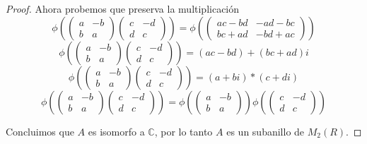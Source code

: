 \documentclass[letter,twoside,12pt]{article}
\begin{document}
\begin{proof}
Ahora probemos que preserva la multiplicaci\'on
\[ \phi\left(\left( \begin{array}{cc}
a & -b \\
b & a \end{array} \right)\left( \begin{array}{cc}
c & -d \\
d & c \end{array} \right)\right) = \phi\left(\left( \begin{array}{cc}
ac-bd & -ad-bc \\
bc+ad & -bd+ac \end{array} \right)\right)\]
\[ \phi\left(\left( \begin{array}{cc}
a & -b \\
b & a \end{array} \right)\left( \begin{array}{cc}
c & -d \\
d & c \end{array} \right)\right) = (ac-bd)+(bc+ad)i\]
\[ \phi\left(\left( \begin{array}{cc}
a & -b \\
b & a \end{array} \right)\left( \begin{array}{cc}
c & -d \\
d & c \end{array} \right)\right) = (a+bi)*(c+di)\]
\[ \phi\left(\left( \begin{array}{cc}
a & -b \\
b & a \end{array} \right)\left( \begin{array}{cc}
c & -d \\
d & c \end{array} \right)\right) = \phi\left(\left( \begin{array}{cc}
a & -b \\
b & a \end{array} \right)\right)\phi\left(\left( \begin{array}{cc}
c & -d \\
d & c \end{array} \right)\right)\]

Concluimos que $A$ es isomorfo a $\mathbb{C}$, por lo tanto $A$ es un subanillo de $M_2(R)$.
\end{proof}
\end{document}
